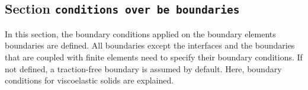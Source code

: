 \documentclass[a4paper,fleqn]{book}
\begin{document}
% 
% 
% 
% 
% 
% 
% 

\subsection{Section \texttt{conditions over be boundaries}}
In this section, the boundary conditions applied on the boundary elements boundaries are defined. All boundaries except the interfaces and the boundaries that are coupled with finite elements need to specify their boundary conditions. If not defined, a traction-free boundary is assumed by default. Here, boundary conditions for viscoelastic solids are explained.
\end{document}
